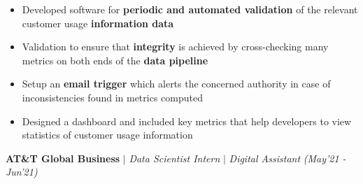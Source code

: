 \documentclass[10.2pt]{article}
\begin{document}
    \begin{itemize}[label={\textbullet},itemsep = -1 mm, leftmargin=*]
        \item Developed software for \textbf{periodic and automated validation} of the relevant customer usage \textbf{information data}
        \item Validation to ensure that \textbf{integrity} is achieved by cross-checking many metrics on both ends of the \textbf{data pipeline}
        \item Setup an \textbf{email trigger} which alerts the concerned authority in case of inconsistencies found in metrics computed
        \item Designed a dashboard and included key metrics that help developers to view statistics of customer usage information
    \end{itemize}
\vspace{-6pt}
\textbf{AT\&T Global Business} \textbf{$|$} {\textit{Data Scientist Intern} \textbf{$|$} \textit{Digital Assistant}} \hfill{\sl \small (May'21 - Jun'21)}  	\\
    \vspace{-0.3cm}
    \hline
    \vspace{-4pt}
\end{document}
